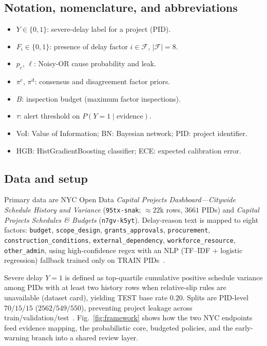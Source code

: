 \documentclass[journal]{IEEEtran}
\begin{document}
\subsection{Notation, nomenclature, and abbreviations}
\begin{itemize}
\item $Y\in\{0,1\}$: severe-delay label for a project (PID).
\item $F_i\in\{0,1\}$: presence of delay factor $i\in\mathcal{F}$, $|\mathcal{F}|=8$.
\item $p_c$, $\ell$: Noisy-OR cause probability and leak.
\item $\pi^{\mathrm{c}}$, $\pi^{\mathrm{d}}$: consensus and disagreement factor priors.
\item $B$: inspection budget (maximum factor inspections).
\item $\tau$: alert threshold on $P(Y{=}1\mid\text{evidence})$.
\item VoI: Value of Information; BN: Bayesian network; PID: project identifier.
\item HGB: HistGradientBoosting classifier; ECE: expected calibration error.
\end{itemize}

\subsection{Data and setup}
Primary data are NYC Open Data \emph{Capital Projects Dashboard---Citywide Schedule History and Variance} (\texttt{95tx-snak}; ${\approx}22$k rows, $3661$ PIDs) and \emph{Capital Projects Schedules \& Budgets} (\texttt{n7gv-k5yt}). Delay-reason text is mapped to eight factors:
\texttt{budget}, \texttt{scope\_design}, \texttt{grants\_approvals}, \texttt{procurement}, \texttt{construction\_conditions}, \texttt{external\_dependency}, \texttt{workforce\_resource}, \texttt{other\_admin}, using high-confidence regex with an NLP (TF--IDF + logistic regression) fallback trained only on TRAIN PIDs~\cite{Onisko2001,Heckerman1996}.

Severe delay $Y{=}1$ is defined as top-quartile cumulative positive schedule variance among PIDs with at least two history rows when relative-slip rules are unavailable (dataset card), yielding TEST base rate $0.20$. Splits are PID-level $70/15/15$ ($2562/549/550$), preventing project leakage across train/validation/test~\cite{Egwim2021,Tagharobi2025}. Fig.~\ref{fig:framework} shows how the two NYC endpoints feed evidence mapping, the probabilistic core, budgeted policies, and the early-warning branch into a shared review layer.
\end{document}
